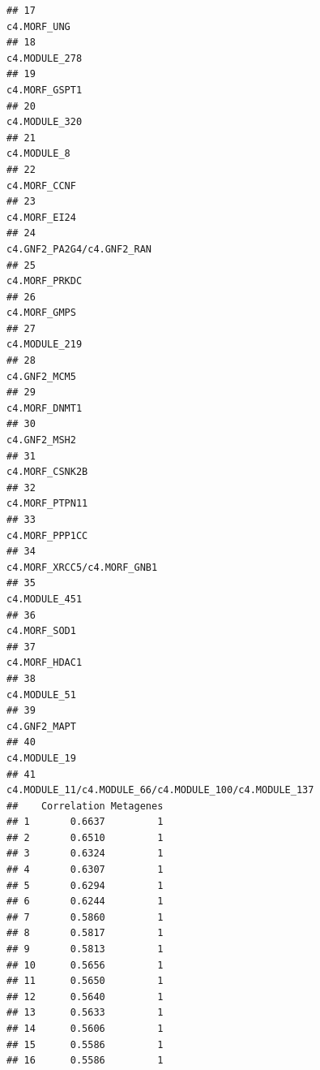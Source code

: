 \documentclass{article}\usepackage[]{graphicx}\usepackage[]{color}
\makeatletter
\newenvironment{kframe}{%
 \def\at@end@of@kframe{}%
 \ifinner\ifhmode%
  \def\at@end@of@kframe{\end{minipage}}%
  \begin{minipage}{\columnwidth}%
 \fi\fi%
 \def\FrameCommand##1{\hskip\@totalleftmargin \hskip-\fboxsep
 \colorbox{shadecolor}{##1}\hskip-\fboxsep
     \hskip-\linewidth \hskip-\@totalleftmargin \hskip\columnwidth}%
 \MakeFramed {\advance\hsize-\width
   \@totalleftmargin\z@ \linewidth\hsize
   \@setminipage}}%
 {\par\unskip\endMakeFramed%
 \at@end@of@kframe}
\newenvironment{knitrout}{}{} %
\makeatother
\begin{document}
\begin{knitrout}
\begin{kframe}
\begin{verbatim}
## 17                                                                     c4.MORF_UNG
## 18                                                                   c4.MODULE_278
## 19                                                                   c4.MORF_GSPT1
## 20                                                                   c4.MODULE_320
## 21                                                                     c4.MODULE_8
## 22                                                                    c4.MORF_CCNF
## 23                                                                    c4.MORF_EI24
## 24                                                       c4.GNF2_PA2G4/c4.GNF2_RAN
## 25                                                                   c4.MORF_PRKDC
## 26                                                                    c4.MORF_GMPS
## 27                                                                   c4.MODULE_219
## 28                                                                    c4.GNF2_MCM5
## 29                                                                   c4.MORF_DNMT1
## 30                                                                    c4.GNF2_MSH2
## 31                                                                  c4.MORF_CSNK2B
## 32                                                                  c4.MORF_PTPN11
## 33                                                                  c4.MORF_PPP1CC
## 34                                                      c4.MORF_XRCC5/c4.MORF_GNB1
## 35                                                                   c4.MODULE_451
## 36                                                                    c4.MORF_SOD1
## 37                                                                   c4.MORF_HDAC1
## 38                                                                    c4.MODULE_51
## 39                                                                    c4.GNF2_MAPT
## 40                                                                    c4.MODULE_19
## 41                           c4.MODULE_11/c4.MODULE_66/c4.MODULE_100/c4.MODULE_137
##    Correlation Metagenes
## 1       0.6637         1
## 2       0.6510         1
## 3       0.6324         1
## 4       0.6307         1
## 5       0.6294         1
## 6       0.6244         1
## 7       0.5860         1
## 8       0.5817         1
## 9       0.5813         1
## 10      0.5656         1
## 11      0.5650         1
## 12      0.5640         1
## 13      0.5633         1
## 14      0.5606         1
## 15      0.5586         1
## 16      0.5586         1

\end{verbatim}
\end{kframe}
\end{knitrout}
\end{document}
